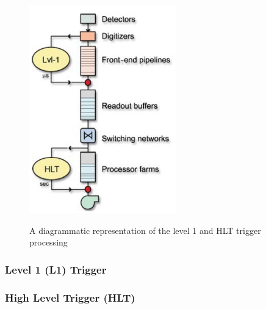 \begin{figure}
\begin{center}
\includegraphics[width=2.5in]{figures/exp_proj/cms-trigger}\\
\caption{A diagrammatic representation of the level 1 and HLT trigger processing}
\end{center}
\end{figure}


\subsubsection{Level 1 (L1) Trigger}

\subsubsection{High Level Trigger (HLT)}

